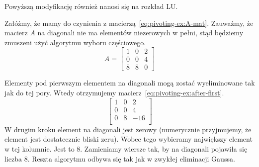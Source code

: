 \documentclass[../main.tex]{subfiles}
\begin{document}
    Powyższą modyfikację również nanosi się na rozkład LU.

    \begin{example}
      Załóżmy, że mamy do czynienia z macierzą~\ref{eq:pivoting-ex:A-mat}. Zauważmy, że
      macierz \( A \) na diagonali nie ma elementów niezerowych w pełni, stąd 
      będziemy zmuszeni użyć algorytmu wyboru częściowego.
      \begin{equation} \label{eq:pivoting-ex:A-mat}
        A = \begin{bmatrix}
          1   & 0   & 2 \\
          0   & 0   & 4 \\ 
          8   & 8   & 0 
        \end{bmatrix}
      \end{equation}

      Elementy pod pierwszym elementem na diagonali mogą zostać wyeliminowane
      tak jak do tej pory. Wtedy otrzymujemy macierz~\ref{eq:pivoting-ex:after-first}.
      \begin{equation} \label{eq:pivoting-ex:after-first}
        \begin{bmatrix}
          1 & 0 & 2   \\
          0 & 0 & 4   \\
          0 & 8 & -16 \\
        \end{bmatrix}
      \end{equation}
      W drugim kroku element na diagonali jest zerowy (numerycznie przyjmujemy,
      że element jest dostatecznie bliski zeru). Wobec tego wybieramy największy
      element w tej kolumnie. Jest to \( 8 \). Zamieniamy wiersze tak, by
      na diagonali pojawiła się liczba \( 8 \). Reszta algorytmu odbywa się tak
      jak w zwykłej eliminacji Gaussa.
    \end{example}
\end{document}
